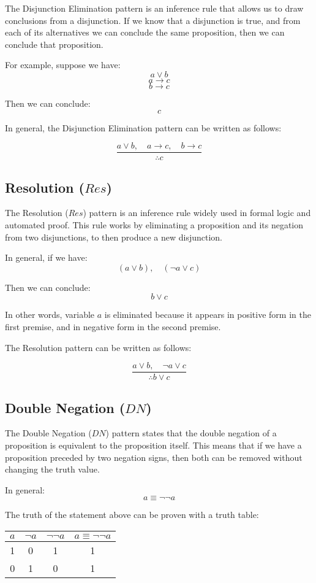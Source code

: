 \documentclass[12pt,a4paper,openany]{article}
\begin{document}
The Disjunction Elimination pattern is an inference rule that allows us to draw conclusions from a disjunction. If we know that a disjunction is true, and from each of its alternatives we can conclude the same proposition, then we can conclude that proposition.

For example, suppose we have:
\[a \lor b\]
\[a \to c\]
\[b \to c\]

Then we can conclude:
\[c\]

In general, the Disjunction Elimination pattern can be written as follows:

\[
\frac{a \lor b, \quad a \to c, \quad b \to c}{\therefore c}
\]

\subsection{Resolution (\(Res\))}\label{resolution-res}

The Resolution (\(Res\)) pattern is an inference rule widely used in formal logic and automated proof. This rule works by eliminating a proposition and its negation from two disjunctions, to then produce a new disjunction.

In general, if we have:
\[(a \lor b), \quad (\lnot a \lor c)\]

Then we can conclude:
\[b \lor c\]

In other words, variable \(a\) is eliminated because it appears in positive form in the first premise, and in negative form in the second premise.

The Resolution pattern can be written as follows:

\[
\frac{a \lor b, \quad \lnot a \lor c}{\therefore b \lor c}
\]

\subsection{Double Negation (\(DN\))}\label{double-negation-dn}

The Double Negation (\(DN\)) pattern states that the double negation of a proposition is equivalent to the proposition itself. This means that if we have a proposition preceded by two negation signs, then both can be removed without changing the truth value.

In general:
\[a \equiv \lnot \lnot a\]

The truth of the statement above can be proven with a truth table:

\begin{center}
\begin{tabular}{|c|c|c|c|}
\hline
\(a\) & \(\lnot a\) & \(\lnot \lnot a\) & \(a \equiv \lnot \lnot a\) \\
\hline
1 & 0 & 1 & 1 \\
0 & 1 & 0 & 1 \\
\hline
\end{tabular}
\end{center}
\end{document}
